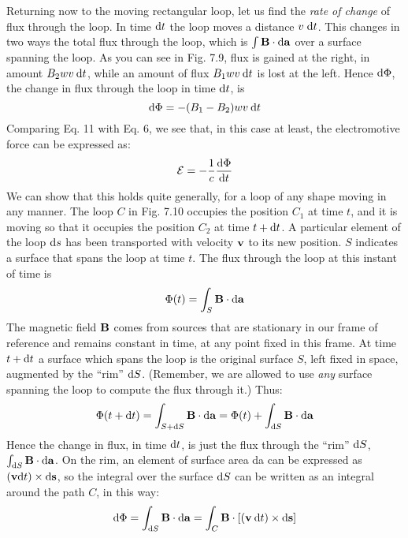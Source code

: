 Returning now to the moving rectangular loop, let us find the \emph{rate
of change} of flux through the loop. In time $\textup{d} t$ the loop moves a distance
$v\;\textup{d} t$. This changes in two ways the total flux through the loop,
which is $\int\mathbf{B}\cdot\textup{d}\mathbf{a}$ over a surface spanning the loop. As you can see
in Fig. 7.9, flux is gained at the right, in amount $B_2 wv\:\textup{d} t$, while an
amount of flux $B_1 wv\:\textup{d} t$ is lost at the left. Hence $\textup{d}\Phi$, the change in
flux through the loop in time $\textup{d} t$, is
\begin{equation}
  \textup{d}\Phi = -(B_1-B_2)wv\:\textup{d} t
\end{equation}
Comparing Eq. 11 with Eq. 6, we see that, in this case at least, the
electromotive force can be expressed as:
\begin{equation}
  \mathcal{E} = -\frac{1}{c}\frac{\textup{d}\Phi}{\textup{d} t}
\end{equation}
We can show that this holds quite generally, for a loop of any shape
moving in any manner. The loop $C$ in Fig. 7.10 occupies the position
$C_1$ at time $t$, and it is moving so that it occupies the position $C_2$ at
time $t + \textup{d} t$. A particular element of the loop $\textup{d} s$ has been transported
with velocity $\mathbf{v}$ to its new position. $S$ indicates a surface that spans
the loop at time $t$. The flux through the loop at this instant of time is
\begin{equation}
  \Phi(t) = \int_S\mathbf{B}\cdot\textup{d}\mathbf{a}
\end{equation}
The magnetic field $\mathbf{B}$ comes from sources that are stationary in our
frame of reference and remains constant in time, at any point fixed
in this frame. At time $t + \textup{d} t$ a surface which spans the loop is the
original surface $S$, left fixed in space, augmented by the ``rim'' $\textup{d} S$.
(Remember, we are allowed to use \emph{any} surface spanning the loop to
compute the flux through it.) Thus:
\begin{equation}
  \Phi(t+\textup{d} t) = \int_{S+\textup{d} S} \mathbf{B}\cdot\textup{d}\mathbf{a} = \Phi(t)+\int_{\textup{d} S}\mathbf{B}\cdot\textup{d}\mathbf{a}
\end{equation}
Hence the change in flux, in time $\textup{d} t$, is just the flux through the ``rim''
$\textup{d} S$, $\int_{\textup{d} S}\mathbf{B}\cdot\textup{d}\mathbf{a}$. On the rim, an element of surface area da can be 
expressed as $(\mathbf{v} \textup{d} t) \times \textup{d}\mathbf{s}$, so the integral over the surface $\textup{d} S$ can be
written as an integral around the path $C$, in this way:
\begin{equation}
  \textup{d}\Phi = \int_{\textup{d} S}\mathbf{B}\cdot\textup{d}\mathbf{a} = \int_C \mathbf{B}\cdot[(\mathbf{v}\:\textup{d} t)\times\textup{d}\mathbf{s}]
\end{equation}
